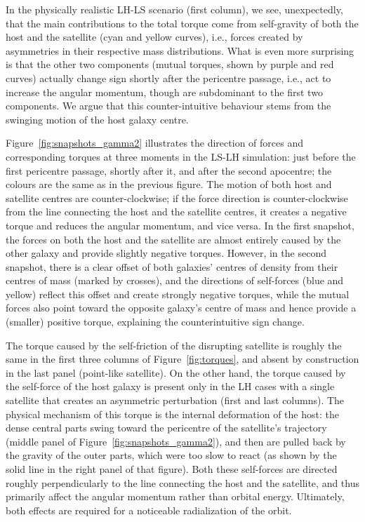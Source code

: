 \documentclass[twocolumn]{aastex63}
\newcommand{\LH}{\textsf{L\!H}\xspace}
\newcommand{\LS}{\textsf{L\!S}\xspace}
\begin{document}
In the physically realistic \LH-\LS scenario (first column), we see, unexpectedly, that the main contributions to the total torque come from self-gravity of both the host and the satellite (cyan and yellow curves), i.e., forces created by asymmetries in their respective mass distributions. What is even more surprising is that the other two components (mutual torques, shown by purple and red curves) actually change sign shortly after the pericentre passage, i.e., act to increase the angular momentum, though are subdominant to the first two components. We argue that this counter-intuitive behaviour stems from the swinging motion of the host galaxy centre. 

Figure~\ref{fig:snapshots_gamma2} illustrates the direction of forces and corresponding torques at three moments in the \LS-\LH simulation: just before the first pericentre passage, shortly after it, and after the second apocentre; the colours are the same as in the previous figure. The motion of both host and satellite centres are counter-clockwise; if the force direction is counter-clockwise from the line connecting the host and the satellite centres, it creates a negative torque and reduces the angular momentum, and vice versa. In the first snapshot, the forces on both the host and the satellite are almost entirely caused by the other galaxy and provide slightly negative torques. However, in the second snapshot, there is a clear offset of both galaxies' centres of density from their centres of mass (marked by crosses), and the directions of self-forces (blue and yellow) reflect this offset and create strongly negative torques, while the mutual forces also point toward the opposite galaxy's centre of mass and hence provide a (smaller) positive torque, explaining the counterintuitive sign change. 

The torque caused by the self-friction of the disrupting satellite is roughly the same in the first three columns of Figure~\ref{fig:torques}, and absent by construction in the last panel (point-like satellite). On the other hand, the torque caused by the self-force of the host galaxy is present only in the \LH cases with a single satellite that creates an asymmetric perturbation (first and last columns). The physical mechanism of this torque is the internal deformation of the host: the dense central parts swing toward the pericentre of the satellite's trajectory (middle panel of Figure~\ref{fig:snapshots_gamma2}), and then are pulled back by the gravity of the outer parts, which were too slow to react (as shown by the solid line in the right panel of that figure). Both these self-forces are directed roughly perpendicularly to the line connecting the host and the satellite, and thus primarily affect the angular momentum rather than orbital energy. Ultimately, both effects are required for a noticeable radialization of the orbit.
\end{document}
